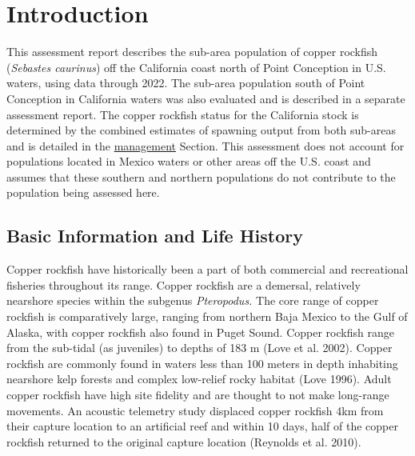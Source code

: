 \documentclass[11pt,
  english,
  letterpaper,
]{article}
\begin{document}
\pagebreak
\setlength{\parskip}{5mm plus1mm minus1mm}
\setcounter{page}{1}
\renewcommand{\thefigure}{\arabic{figure}}
\renewcommand{\thetable}{\arabic{table}}
\setcounter{table}{0}
\setcounter{figure}{0}

\hypertarget{introduction}{%
\section{Introduction}\label{introduction}}

This assessment report describes the sub-area population of copper rockfish (\emph{Sebastes caurinus}) off the California coast north of Point Conception in U.S. waters, using data through 2022. The sub-area population south of Point Conception in California waters was also evaluated and is described in a separate assessment report. The copper rockfish status for the California stock is determined by the combined estimates of spawning output from both sub-areas and is detailed in the \protect\hyperlink{management}{management} Section. This assessment does not account for populations located in Mexico waters or other areas off the U.S. coast and assumes that these southern and northern populations do not contribute to the population being assessed here.

\hypertarget{basic-information-and-life-history}{%
\subsection{Basic Information and Life History}\label{basic-information-and-life-history}}

Copper rockfish have historically been a part of both commercial and recreational fisheries throughout its range. Copper rockfish are a demersal, relatively nearshore species within the subgenus \emph{Pteropodus.} The core range of copper rockfish is comparatively large, ranging from northern Baja Mexico to the Gulf of Alaska, with copper rockfish also found in Puget Sound. Copper rockfish range from the sub-tidal (as juveniles) to depths of 183 m (Love et al. 2002). Copper rockfish are commonly found in waters less than 100 meters in depth inhabiting nearshore kelp forests and complex low-relief rocky habitat (Love 1996). Adult copper rockfish have high site fidelity and are thought to not make long-range movements. An acoustic telemetry study displaced copper rockfish 4km from their capture location to an artificial reef and within 10 days, half of the copper rockfish returned to the original capture location (Reynolds et al. 2010).
\end{document}
